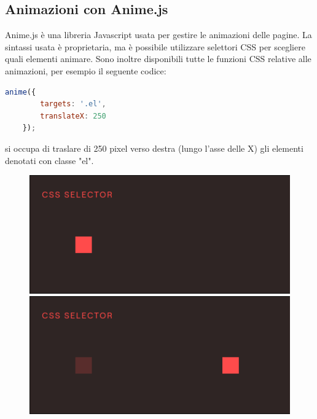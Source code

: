 \subsection{Animazioni con Anime.js}
\noindent Anime.js è una libreria Javascript usata per gestire le animazioni delle pagine.\newline
La sintassi usata è proprietaria, ma è possibile utilizzare selettori CSS per scegliere quali elementi animare.
Sono inoltre disponibili tutte le funzioni CSS relative alle animazioni, per esempio il seguente codice:
\begin{lstlisting}[language=Javascript]
    anime({
        targets: '.el',
        translateX: 250
    });
\end{lstlisting}
si occupa di traslare di 250 pixel verso destra (lungo l'asse delle X) gli elementi denotati con classe "el".
\begin{figure}[H]
\centering
\begin{minipage}{.5\textwidth}
  \centering
  \includegraphics[width=.9\linewidth]{img/beforeAnime.png}
\end{minipage}%
\begin{minipage}{.5\textwidth}
  \centering
  \includegraphics[width=.9\linewidth]{img/afterAnime.png}
\end{minipage}
\end{figure}
